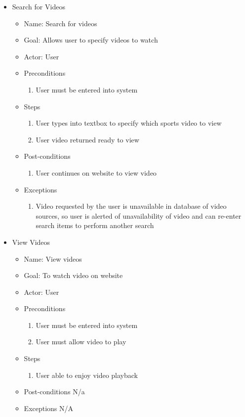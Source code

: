 \begin{itemize}
\item Search for Videos
	\begin{itemize}
	\item Name: Search for videos 
    \item Goal: Allows user to specify videos to watch
    \item Actor: User
    \item Preconditions
		\begin{enumerate}
		\item User must be entered into system
        \end{enumerate}
    \item Steps
    	\begin{enumerate}
		\item User types into textbox to specify which sports video to view
        \item User video returned ready to view
        \end{enumerate}
    \item Post-conditions
    	\begin{enumerate}
		\item User continues on website to view video
        \end{enumerate}
    \item Exceptions
    	\begin{enumerate}
    	\item Video requested by the user is unavailable in database of video sources, so user is alerted of unavailability of video and can re-enter search items to perform another search
    	\end{enumerate}
    \end{itemize}

\item View Videos
	\begin{itemize}
	\item Name: View videos 
    \item Goal: To watch video on website
    \item Actor: User
    \item Preconditions
		\begin{enumerate}
		\item User must be entered into system
        \item User must allow video to play
        \end{enumerate}
    \item Steps
    	\begin{enumerate}
		\item User able to enjoy video playback
        \end{enumerate}
    \item Post-conditions N/a
    \item Exceptions N/A
    \end{itemize}
    

\end{itemize}
